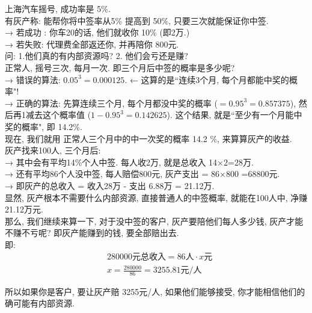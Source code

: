 \documentclass[UTF8]{ctexart}
\begin{document}
	
	\begin{myEnvSample}
		上海汽车摇号, 成功率是 5\%. \\
		有灰产称: 能帮你将中签率从5\% 提高到 50\%, 只要三次就能保证你中签. \\
		→ 若成功 : 你车20的话, 他们就收你 10\% (即2万.) \\
		→ 若失败: 代理费全部返还你, 并再陪你 800元. \\
		问: 1.他们真的有内部资源吗? 2. 他们会亏还是赚? \\
		
		正常人, 摇号三次, 每月一次. 即三个月后中签的概率是多少呢? \\
		→ 错误的算法: $	0.05^3=0.000125	$. ← 这算的是``连续3个月, 每个月都能中奖的概率"! \\
		→ 正确的算法: 先算连续三个月, 每个月都没中奖的概率 ($=0.95^3=0.857375	$), 然后再1减去这个概率值 ($1-0.95^3=0.142625$). 这个结果, 就是``至少有一个月能中奖的概率", 即 14.2\%. \\
		
		现在, 我们就用 正常人三个月中的中一次奖的概率 14.2 \%, 来算算灰产的收益. \\
		灰产找来100人, 三个月后: \\
		→ 其中会有平均14\%个人中签. 每人收2万, 就是总收入 14×2=28万. \\
		→ 还有平均86个人没中签, 每人赔偿800元, 灰产支出 = 86×800 =68800元. \\
		→ 即灰产的总收入 = 收入28万 - 支出 6.88万 = 21.12万. \\
		显然, 灰产根本不需要什么内部资源, 直接普通人的中签概率, 就能在100人中, 净赚21.12万元. \\
		
		那么, 我们继续来算一下, 对于没中签的客户, 灰产要陪他们每人多少钱, 灰产才能不赚不亏呢?  即灰产能赚到的钱, 要全部赔出去. \\
		即: 
		\begin{align*}  %
&	280000\text{元总收入}=86\text{人}\cdot x\text{元}\\
& x=\frac{280000}{86}=3255.81\text{元/人}
		\end{align*} 
	
	所以如果你是客户, 要让灰产赔 3255元/人, 如果他们能够接受, 你才能相信他们的确可能有内部资源.
	
		
		
		
		

	\end{myEnvSample}
	
	
	
\end{document}

